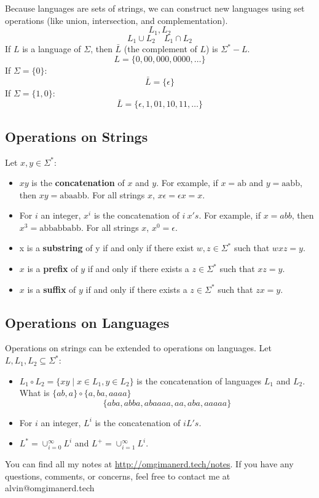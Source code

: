 \documentclass[letterpaper, 12pt]{math}
\begin{document}
Because languages are sets of strings, we can construct new languages using
set operations (like union, intersection, and complementation).
\[ L_{1}, L_{2} \]
\[ L_{1}\cup L_{2} \quad L_{1}\cap L_{2} \]
If \( L \) is a language of \( \Sigma \), then \( \bar{L} \) (the complement of
\( L \)) is \( \Sigma^*-L \).
\[ L = \{0,00,000,0000,\dots\} \]
If \( \Sigma = \{0\} \):
\[ \bar{L} = \{\epsilon\} \]
If \( \Sigma = \{1,0\} \):
\[ \bar{L} = \{\epsilon,1,01,10,11,\dots\} \]

\subsection*{Operations on Strings}
Let \( x,y\in\Sigma^* \):
\begin{itemize}
  \item \( xy \) is the \textbf{concatenation} of \( x \) and \( y \). For
    example, if \( x = \text{ab} \) and \( y = \text{aabb} \), then \( xy =
    \text{abaabb} \). For all strings \( x \), \( x\epsilon = \epsilon x =
    x \).
  \item For \( i \) an integer, \( x^i \) is the concatenation of \( i\ x's \).
    For example, if \( x = abb \), then \( x^{3} = \text{abbabbabb} \). For all
    strings \( x \), \( x^0 = \epsilon \).
  \item x is a \textbf{substring} of y if and only if there exist \( w,z\in
    \Sigma^* \) such that \( wxz = y \).
  \item \( x \) is a \textbf{prefix} of \( y \) if and only if there exists a
    \( z\in\Sigma^* \) such that \( xz = y \).
  \item \( x \) is a \textbf{suffix} of \( y \) if and only if there exists a
    \( z\in\Sigma^* \) such that \( zx = y \).
\end{itemize}

\subsection*{Operations on Languages}
Operations on strings can be extended to operations on languages. Let
\( L,L_1,L_2\subseteq\Sigma^* \):
\begin{itemize}
  \item \( L_1\circ L_2 = \{xy\mid x\in L_1,y\in L_2\} \) is the concatenation
    of languages \( L_1 \) and \( L_2 \). What is \( \{ab,a\}\circ\{a,ba,aaaa\}
    \)
    \[ \{aba,abba,abaaaa,aa,aba,aaaaa\} \]
  \item For \( i \) an integer, \( L^i \) is the concatenation of \( i L's \).
  \item \( L^* = \cup_{i=0}^{\infty}L^i \) and
    \( L^+ = \cup_{i=1}^{\infty}L^i \).
\end{itemize}

\begin{center}
  You can find all my notes at \url{http://omgimanerd.tech/notes}. If you have
  any questions, comments, or concerns, feel free to contact me at
  alvin@omgimanerd.tech
\end{center}
\end{document}
